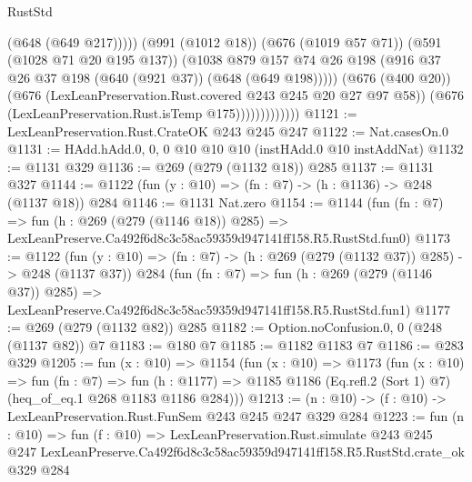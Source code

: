 \begin{lexlean}{RustStd}
\begin{coremodule}
                                  (@648 (@649 @217)))))
                            (@991 (@1012 @18))
                            (@676 (@1019 @57 @71))
                            (@591 (@1028 @71 @20 @195 @137))
                            (@1038
                              @879
                              @157
                              @74
                              @26
                              @198
                              (@916 @37 @26 @37 @198 (@640 (@921 @37)) (@648 (@649 @198)))))
                          (@676 (@400 @20))
                          (@676 (LexLeanPreservation.Rust.covered @243 @245 @20 @27 @97 @58))
                          (@676 (LexLeanPreservation.Rust.isTemp @175)))))))))))))
@1121 := LexLeanPreservation.Rust.CrateOK @243 @245 @247
@1122 := Nat.casesOn.{0}
@1131 := HAdd.hAdd.{0, 0, 0} @10 @10 @10 (instHAdd.{0} @10 instAddNat)
@1132 := @1131 @329
@1136 := @269 (@279 (@1132 @18)) @285
@1137 := @1131 @327
@1144 := @1122 (fun (y : @10) => (fn : @7) -> (h : @1136) -> @248 (@1137 @18)) @284
@1146 := @1131 Nat.zero
@1154 := @1144
    (fun (fn : @7) =>
    fun (h : @269 (@279 (@1146 @18)) @285) =>
    LexLeanPreserve.Ca492f6d8c3c58ac59359d947141ff158.R5.RustStd.fun0)
@1173 := @1122
    (fun (y : @10) => (fn : @7) -> (h : @269 (@279 (@1132 @37)) @285) -> @248 (@1137 @37))
    @284
    (fun (fn : @7) =>
    fun (h : @269 (@279 (@1146 @37)) @285) =>
    LexLeanPreserve.Ca492f6d8c3c58ac59359d947141ff158.R5.RustStd.fun1)
@1177 := @269 (@279 (@1132 @82)) @285
@1182 := Option.noConfusion.{0, 0} (@248 (@1137 @82)) @7
@1183 := @180 @7
@1185 := @1182 @1183 @7
@1186 := @283 @329
@1205 := fun (x : @10) =>
  @1154
    (fun (x : @10) =>
    @1173
      (fun (x : @10) =>
      fun (fn : @7) =>
      fun (h : @1177) =>
      @1185 @1186 (Eq.refl.{2} (Sort 1) @7) (heq_of_eq.{1} @268 @1183 @1186 @284)))
@1213 := (n : @10) -> (f : @10) -> LexLeanPreservation.Rust.FunSem @243 @245 @247 @329 @284
@1223 := fun (n : @10) =>
  fun (f : @10) =>
  LexLeanPreservation.Rust.simulate
    @243
    @245
    @247
    LexLeanPreserve.Ca492f6d8c3c58ac59359d947141ff158.R5.RustStd.crate_ok
    @329
    @284
\end{coremodule}
\end{lexlean}

